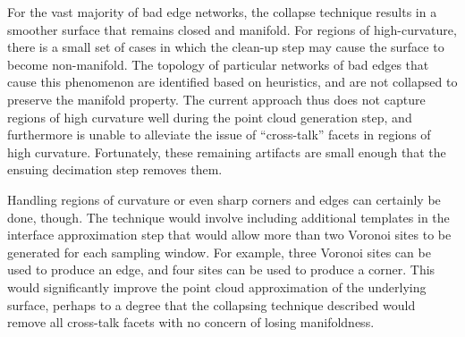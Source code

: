 For the vast majority of bad edge networks, the collapse technique results in a smoother surface that remains closed and manifold. For regions of high-curvature, there is a small set of cases in which the clean-up step may cause the surface to become non-manifold. The topology of particular networks of bad edges that cause this phenomenon are identified based on heuristics, and are not collapsed to preserve the manifold property. The current approach thus does not capture regions of high curvature well during the point cloud generation step, and furthermore is unable to alleviate the issue of ``cross-talk'' facets in regions of high curvature. Fortunately, these remaining artifacts are small enough that the ensuing decimation step removes them.

Handling regions of curvature or even sharp corners and edges can certainly be done, though. The technique would involve including additional templates in the interface approximation step that would allow more than two Voronoi sites to be generated for each sampling window. For example, three Voronoi sites can be used to produce an edge, and four sites can be used to produce a corner. This would significantly improve the point cloud approximation of the underlying surface, perhaps to a degree that the collapsing technique described would remove all cross-talk facets with no concern of losing manifoldness.

